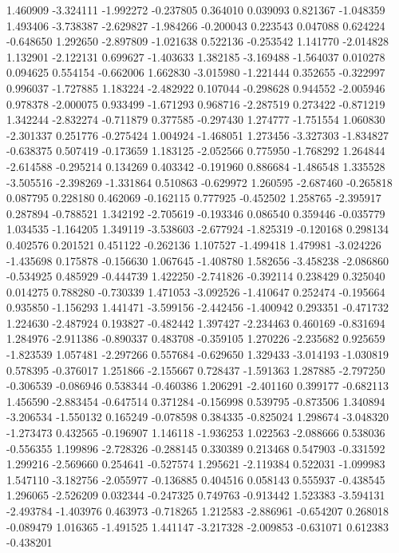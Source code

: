 1.460909
-3.324111
-1.992272
-0.237805
0.364010
0.039093
0.821367
-1.048359
1.493406
-3.738387
-2.629827
-1.984266
-0.200043
0.223543
0.047088
0.624224
-0.648650
1.292650
-2.897809
-1.021638
0.522136
-0.253542
1.141770
-2.014828
1.132901
-2.122131
0.699627
-1.403633
1.382185
-3.169488
-1.564037
0.010278
0.094625
0.554154
-0.662006
1.662830
-3.015980
-1.221444
0.352655
-0.322997
0.996037
-1.727885
1.183224
-2.482922
0.107044
-0.298628
0.944552
-2.005946
0.978378
-2.000075
0.933499
-1.671293
0.968716
-2.287519
0.273422
-0.871219
1.342244
-2.832274
-0.711879
0.377585
-0.297430
1.274777
-1.751554
1.060830
-2.301337
0.251776
-0.275424
1.004924
-1.468051
1.273456
-3.327303
-1.834827
-0.638375
0.507419
-0.173659
1.183125
-2.052566
0.775950
-1.768292
1.264844
-2.614588
-0.295214
0.134269
0.403342
-0.191960
0.886684
-1.486548
1.335528
-3.505516
-2.398269
-1.331864
0.510863
-0.629972
1.260595
-2.687460
-0.265818
0.087795
0.228180
0.462069
-0.162115
0.777925
-0.452502
1.258765
-2.395917
0.287894
-0.788521
1.342192
-2.705619
-0.193346
0.086540
0.359446
-0.035779
1.034535
-1.164205
1.349119
-3.538603
-2.677924
-1.825319
-0.120168
0.298134
0.402576
0.201521
0.451122
-0.262136
1.107527
-1.499418
1.479981
-3.024226
-1.435698
0.175878
-0.156630
1.067645
-1.408780
1.582656
-3.458238
-2.086860
-0.534925
0.485929
-0.444739
1.422250
-2.741826
-0.392114
0.238429
0.325040
0.014275
0.788280
-0.730339
1.471053
-3.092526
-1.410647
0.252474
-0.195664
0.935850
-1.156293
1.441471
-3.599156
-2.442456
-1.400942
0.293351
-0.471732
1.224630
-2.487924
0.193827
-0.482442
1.397427
-2.234463
0.460169
-0.831694
1.284976
-2.911386
-0.890337
0.483708
-0.359105
1.270226
-2.235682
0.925659
-1.823539
1.057481
-2.297266
0.557684
-0.629650
1.329433
-3.014193
-1.030819
0.578395
-0.376017
1.251866
-2.155667
0.728437
-1.591363
1.287885
-2.797250
-0.306539
-0.086946
0.538344
-0.460386
1.206291
-2.401160
0.399177
-0.682113
1.456590
-2.883454
-0.647514
0.371284
-0.156998
0.539795
-0.873506
1.340894
-3.206534
-1.550132
0.165249
-0.078598
0.384335
-0.825024
1.298674
-3.048320
-1.273473
0.432565
-0.196907
1.146118
-1.936253
1.022563
-2.088666
0.538036
-0.556355
1.199896
-2.728326
-0.288145
0.330389
0.213468
0.547903
-0.331592
1.299216
-2.569660
0.254641
-0.527574
1.295621
-2.119384
0.522031
-1.099983
1.547110
-3.182756
-2.055977
-0.136885
0.404516
0.058143
0.555937
-0.438545
1.296065
-2.526209
0.032344
-0.247325
0.749763
-0.913442
1.523383
-3.594131
-2.493784
-1.403976
0.463973
-0.718265
1.212583
-2.886961
-0.654207
0.268018
-0.089479
1.016365
-1.491525
1.441147
-3.217328
-2.009853
-0.631071
0.612383
-0.438201
